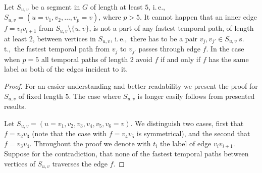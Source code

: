 \documentclass[a4paper,UKenglish,cleveref, autoref, thm-restate, anonymous]{lipics-v2021}
\newcommand{\ie}{i.\,e.,\ }
\renewcommand{\st}{s.\,t.,\ }
\begin{document}
\begin{lemma}\label{lemma:FPT-noUndeterminedEdgeInSegment}
Let $S_{u,v}$ be a segment in $G$ of length at least $5$,
\ie $S_{u,v}= (u=v_1,v_2, \dots, v_p = v)$, where $p > 5$.
It cannot happen that an inner edge $f = v_i v_{i+1}$ from $S_{u,v} \setminus \{u,v\}$,
is not a part of any fastest temporal path, of length at least $2$, between vertices in $S_{u,v}$,
\ie there has to be a pair $v_j, v_{j'} \in S_{u,v}$ \st the fastest temporal path from $v_j$ to $v_{j'}$ passes through edge $f$.
In the case when $p = 5$ all temporal paths of length $2$ avoid $f$ if and only if $f$ has the same label as both of the edges incident to it.
\end{lemma}

\begin{proof}
    For an easier understanding and better readability we present the proof for $S_{u,v}$ of fixed length $5$.
    The case where $S_{u,v}$ is longer easily follows from presented results.

    Let $S_{u,v} = (u=v_1,v_2, v_3, v_4, v_5, v_6=v)$.
    We distinguish two cases, first that $f = v_2v_3$ (note that the case with $f = v_4v_5$ is symmetrical),
    and the second that  $f = v_3v_4$.
    Throughout the proof we denote with $t_i$ the label of edge $v_i v_{i+1}$.
    Suppose for the contradiction, that none of the fastest temporal paths between vertices of $S_{u,v}$ traverses the edge $f$.


\end{proof}
\end{document}

